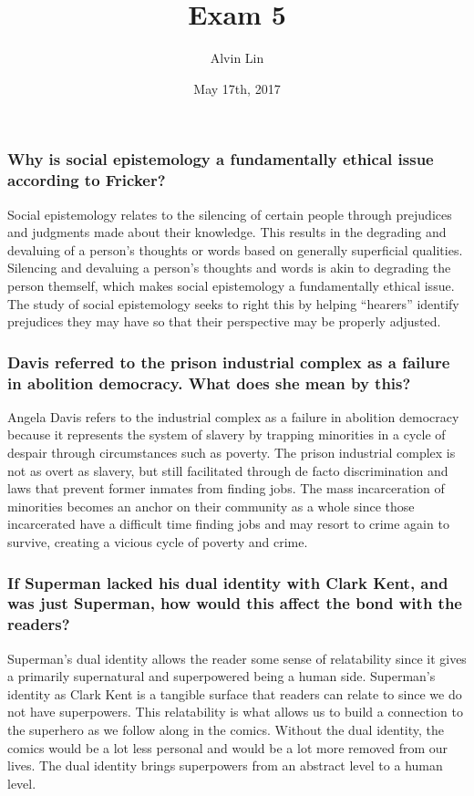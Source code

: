 \documentclass{article}
\title{Exam 5}
\author{Alvin Lin}
\date{May 17th, 2017}
\begin{document}
\maketitle

\subsubsection*{Why is social epistemology a fundamentally ethical issue
according to Fricker?}
Social epistemology relates to the silencing of certain people through
prejudices and judgments made about their knowledge. This results in the
degrading and devaluing of a person's thoughts or words based on generally
superficial qualities. Silencing and devaluing a person's thoughts and words
is akin to degrading the person themself, which makes social epistemology
a fundamentally ethical issue. The study of social epistemology seeks to right
this by helping ``hearers'' identify prejudices they may have so that their
perspective may be properly adjusted.

\subsubsection*{Davis referred to the prison industrial complex as a failure
in abolition democracy. What does she mean by this?}
Angela Davis refers to the industrial complex as a failure in abolition
democracy because it represents the system of slavery by trapping minorities
in a cycle of despair through circumstances such as poverty. The prison
industrial complex is not as overt as slavery, but still facilitated through
de facto discrimination and laws that prevent former inmates from finding jobs.
The mass incarceration of minorities becomes an anchor on their community as a
whole since those incarcerated have a difficult time finding jobs and may
resort to crime again to survive, creating a vicious cycle of poverty and crime.

\subsubsection*{If Superman lacked his dual identity with Clark Kent, and was
just Superman, how would this affect the bond with the readers?}
Superman's dual identity allows the reader some sense of relatability since
it gives a primarily supernatural and superpowered being a human side.
Superman's identity as Clark Kent is a tangible surface that readers can
relate to since we do not have superpowers. This relatability is what allows
us to build a connection to the superhero as we follow along in the comics.
Without the dual identity, the comics would be a lot less personal and would
be a lot more removed from our lives. The dual identity brings superpowers
from an abstract level to a human level.
\end{document}

